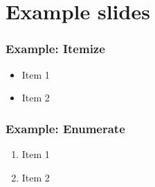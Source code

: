 \section{Example slides}

    \begin{frame}
        \frametitle{}

    \end{frame}


    \begin{frame}
        \frametitle{Example: Itemize}

        \begin{itemize}
            \item Item 1
            \item Item 2
        \end{itemize}

    \end{frame}


    \begin{frame}
        \frametitle{Example: Enumerate}

        \begin{enumerate}
            \item Item 1
            \item Item 2
        \end{enumerate}

    \end{frame}


